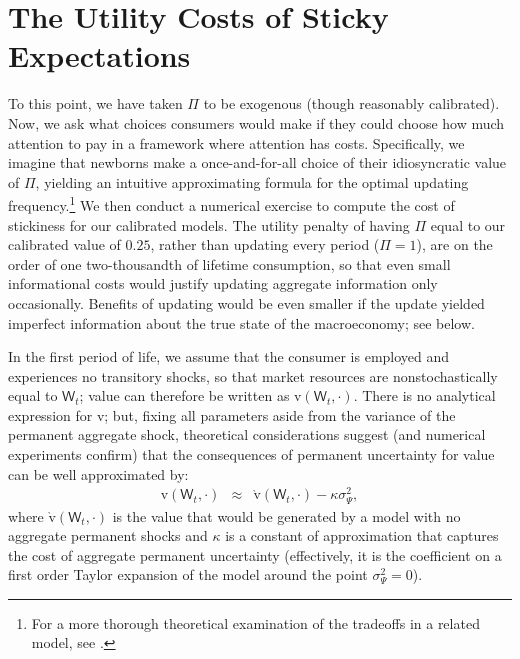 \documentclass[titlepage]{./econtex}
\begin{document}
 
\section{The Utility Costs of Sticky Expectations}\label{sec:uCost}

To this point, we have taken $\Pi$ to be exogenous (though reasonably calibrated).  Now, we ask what choices consumers would make if they could choose how much attention to pay in a framework where attention has costs.  Specifically, we imagine that newborns make a once-and-for-all choice of their idiosyncratic value of $\Pi$, yielding an intuitive approximating formula for the optimal updating frequency.\footnote{For a more thorough theoretical examination of the tradeoffs in a related model, see \cite{reis:inattentive}.}  We then conduct a numerical exercise to compute the cost of stickiness for our calibrated models.  The utility penalty of having $\Pi$ equal to our calibrated value of $0.25$, rather than updating every period ($\Pi=1$), are on the order of one two-thousandth of lifetime consumption, so that even small informational costs would justify updating aggregate information only occasionally.  Benefits of updating would be even smaller if the update yielded imperfect information about the true state of the macroeconomy; see below.

In the first period of life, we assume that the consumer is employed and experiences no transitory shocks, so that market resources are nonstochastically equal to $\mathsf{W}_t$; value can therefore be written as $\mathrm{v}(\mathsf{W}_t,\cdot)$.  There is no analytical expression for $\mathrm{v}$; but, fixing all parameters aside from the variance of the permanent aggregate shock, theoretical considerations suggest (and numerical experiments confirm) that the consequences of permanent uncertainty for value can be well approximated by:
\begin{eqnarray*}
   \mathrm{v}(\mathsf{W}_t,\cdot) & \approx & \grave{\mathrm{v}}(\mathsf{W}_t,\cdot) - \kappa \sigma^{2}_{\Psi}, \label{eq:vApprox}
\end{eqnarray*}
  where $\grave{\mathrm{v}}(\mathsf{W}_t,\cdot)$ is the value that would be generated by a model with no aggregate permanent shocks and $\kappa$ is a constant of approximation that captures the cost of aggregate permanent uncertainty (effectively, it is the coefficient on a first order Taylor expansion of the model around the point $\sigma_{\Psi}^{2}=0$).
\end{document}
